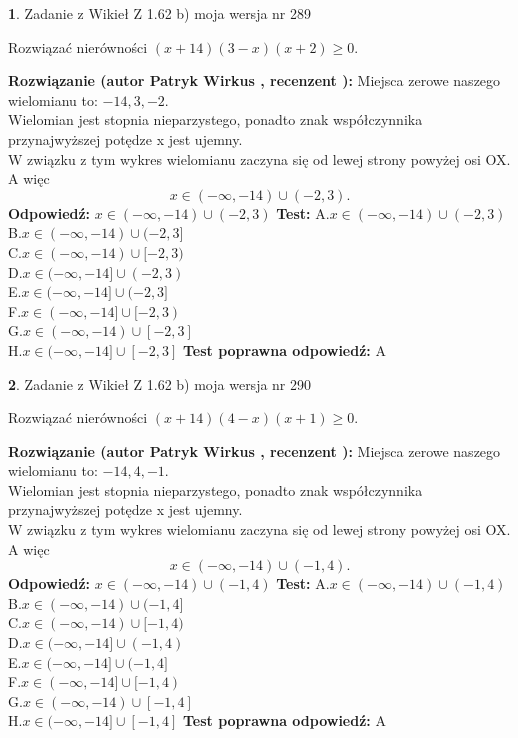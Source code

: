 \documentclass[12pt, a4paper]{article}
\theoremstyle{definition} %
\newtheorem{zad}{}
\newcommand{\zadStart}[1]{\begin{zad}#1\newline}
\newcommand{\zadStop}{\end{zad}}
\newcommand{\rozwStart}[2]{\noindent \textbf{Rozwiązanie (autor #1 , recenzent #2): }\newline}
\newcommand{\rozwStop}{\newline}
\newcommand{\odpStart}{\noindent \textbf{Odpowiedź:}\newline}
\newcommand{\odpStop}{\newline}
\newcommand{\testStart}{\noindent \textbf{Test:}\newline}
\newcommand{\testStop}{\newline}
\newcommand{\kluczStart}{\noindent \textbf{Test poprawna odpowiedź:}\newline}
\newcommand{\kluczStop}{\newline}
\begin{document}
\zadStart{Zadanie z Wikieł Z 1.62 b) moja wersja nr 289}

Rozwiązać nierówności $(x+14)(3-x)(x+2)\ge0$.
\zadStop
\rozwStart{Patryk Wirkus}{}
Miejsca zerowe naszego wielomianu to: $-14, 3, -2$.\\
Wielomian jest stopnia nieparzystego, ponadto znak współczynnika przy\linebreak najwyższej potędze x jest ujemny.\\ W związku z tym wykres wielomianu zaczyna się od lewej strony powyżej osi OX. A więc $$x \in (-\infty,-14) \cup (-2,3).$$
\rozwStop
\odpStart
$x \in (-\infty,-14) \cup (-2,3)$
\odpStop
\testStart
A.$x \in (-\infty,-14) \cup (-2,3)$\\
B.$x \in (-\infty,-14) \cup (-2,3]$\\
C.$x \in (-\infty,-14) \cup [-2,3)$\\
D.$x \in (-\infty,-14] \cup (-2,3)$\\
E.$x \in (-\infty,-14] \cup (-2,3]$\\
F.$x \in (-\infty,-14] \cup [-2,3)$\\
G.$x \in (-\infty,-14) \cup [-2,3]$\\
H.$x \in (-\infty,-14] \cup [-2,3]$
\testStop
\kluczStart
A
\kluczStop



\zadStart{Zadanie z Wikieł Z 1.62 b) moja wersja nr 290}

Rozwiązać nierówności $(x+14)(4-x)(x+1)\ge0$.
\zadStop
\rozwStart{Patryk Wirkus}{}
Miejsca zerowe naszego wielomianu to: $-14, 4, -1$.\\
Wielomian jest stopnia nieparzystego, ponadto znak współczynnika przy\linebreak najwyższej potędze x jest ujemny.\\ W związku z tym wykres wielomianu zaczyna się od lewej strony powyżej osi OX. A więc $$x \in (-\infty,-14) \cup (-1,4).$$
\rozwStop
\odpStart
$x \in (-\infty,-14) \cup (-1,4)$
\odpStop
\testStart
A.$x \in (-\infty,-14) \cup (-1,4)$\\
B.$x \in (-\infty,-14) \cup (-1,4]$\\
C.$x \in (-\infty,-14) \cup [-1,4)$\\
D.$x \in (-\infty,-14] \cup (-1,4)$\\
E.$x \in (-\infty,-14] \cup (-1,4]$\\
F.$x \in (-\infty,-14] \cup [-1,4)$\\
G.$x \in (-\infty,-14) \cup [-1,4]$\\
H.$x \in (-\infty,-14] \cup [-1,4]$
\testStop
\kluczStart
A
\kluczStop
\end{document}
